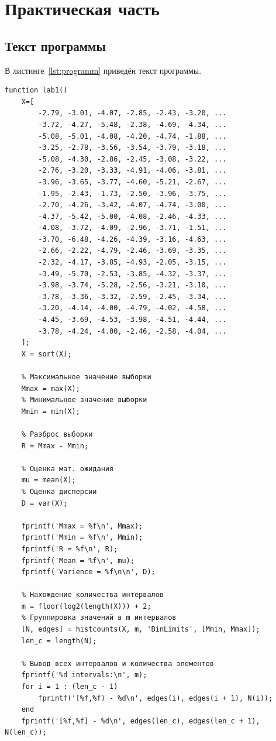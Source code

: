 \chapter{Практическая часть}
\section{Текст программы}
\lstset{language=matlab}

В листинге~\ref{lst:programm} приведён текст программы.
\begin{lstlisting}[caption={Текст программы},label={lst:programm}]
function lab1()
    X=[
        -2.79, -3.01, -4.07, -2.85, -2.43, -3.20, ...
        -3.72, -4.27, -5.48, -2.38, -4.69, -4.34, ...
        -5.08, -5.01, -4.08, -4.20, -4.74, -1.88, ...
        -3.25, -2.78, -3.56, -3.54, -3.79, -3.18, ...
        -5.08, -4.30, -2.86, -2.45, -3.08, -3.22, ...
        -2.76, -3.20, -3.33, -4.91, -4.06, -3.81, ...
        -3.96, -3.65, -3.77, -4.60, -5.21, -2.67, ...
        -1.95, -2.43, -1.73, -2.50, -3.96, -3.75, ...
        -2.70, -4.26, -3.42, -4.07, -4.74, -3.00, ...
        -4.37, -5.42, -5.00, -4.08, -2.46, -4.33, ...
        -4.08, -3.72, -4.09, -2.96, -3.71, -1.51, ...
        -3.70, -6.48, -4.26, -4.39, -3.16, -4.63, ...
        -2.66, -2.22, -4.79, -2.46, -3.69, -3.35, ...
        -2.32, -4.17, -3.85, -4.93, -2.05, -3.15, ...
        -3.49, -5.70, -2.53, -3.85, -4.32, -3.37, ...
        -3.98, -3.74, -5.28, -2.56, -3.21, -3.10, ...
        -3.78, -3.36, -3.32, -2.59, -2.45, -3.34, ...
        -3.20, -4.14, -4.00, -4.79, -4.02, -4.58, ...
        -4.45, -3.69, -4.53, -3.98, -4.51, -4.44, ...
        -3.78, -4.24, -4.00, -2.46, -2.58, -4.04, ...
    ];
    X = sort(X);

    % Максимальное значение выборки
    Mmax = max(X);
    % Минимальное значение выборки
    Mmin = min(X);

    % Разброс выборки
    R = Mmax - Mmin;

    % Оценка мат. ожидания
    mu = mean(X);
    % Оценка дисперсии
    D = var(X);

    fprintf('Mmax = %f\n', Mmax);
    fprintf('Mmin = %f\n', Mmin);
    fprintf('R = %f\n', R);
    fprintf('Mean = %f\n', mu);
    fprintf('Varience = %f\n\n', D);

    % Нахождение количества интервалов
    m = floor(log2(length(X))) + 2;
    % Группировка значений в m интервалов
    [N, edges] = histcounts(X, m, 'BinLimits', [Mmin, Mmax]);
    len_c = length(N);

    % Вывод всех интервалов и количества элементов
    fprintf('%d intervals:\n', m);
    for i = 1 : (len_c - 1)
        fprintf('[%f,%f) - %d\n', edges(i), edges(i + 1), N(i));
    end
    fprintf('[%f,%f] - %d\n', edges(len_c), edges(len_c + 1), N(len_c));


\end{lstlisting}
